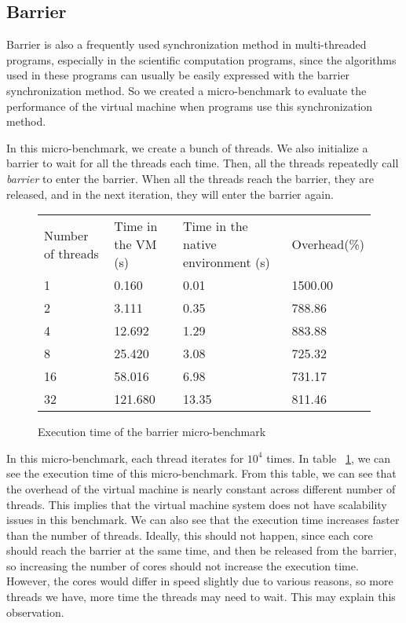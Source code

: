 \subsection{Barrier}
Barrier is also a frequently used synchronization method in multi-threaded
programs, especially in the scientific computation programs, since the
algorithms used in these programs can usually be easily expressed with the
barrier synchronization method. So we created a micro-benchmark to evaluate
the performance of the virtual machine when programs use this synchronization
method.

In this micro-benchmark, we create a bunch of threads. We also initialize
a barrier to wait for all the threads each time. Then, all the threads
repeatedly call {\em barrier} to enter the barrier. When all the threads
reach the barrier, they are released, and in the next iteration, they will
enter the barrier again.

\begin{figure}[here]
\begin{tabular}{  l | l | l | l }
	Number of threads & Time in the VM (s) & Time in the native environment (s) & Overhead(\%) \\
	1 & 0.160 & 0.01 & 1500.00 \\
	2 & 3.111 & 0.35 & 788.86 \\
	4 & 12.692 & 1.29 & 883.88 \\
	8 & 25.420 & 3.08 & 725.32 \\
	16 & 58.016 & 6.98 & 731.17 \\
	32 & 121.680 & 13.35 & 811.46 \\
\end{tabular}
\caption{Execution time of the barrier micro-benchmark}
\label{fig:barrier}
\end{figure}

In this micro-benchmark, each thread iterates for $10^4$ times.
In table ~\ref{fig:barrier}, we can see the execution time of this micro-benchmark.
From this table, we can see that the overhead of the virtual machine is nearly
constant across different number of threads. This implies that the virtual
machine system does not have scalability issues in this benchmark.
We can also see that the execution time increases faster than the number of
threads. Ideally, this should not happen, since each core should reach the
barrier at the same time, and then be released from the barrier, so increasing
the number of cores should not increase the execution time. However, the cores
would differ in speed slightly due to various reasons, so more threads we have, 
more time the threads may need to wait. This may explain this observation.


